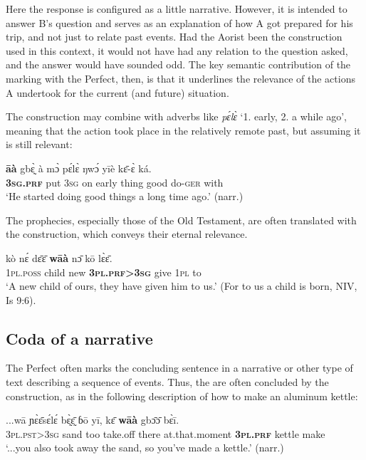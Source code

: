 \documentclass[output=paper]{LSP/langsci}
\begin{document}
Here the response is configured as a little narrative. However, it is intended to answer B's question and serves as an explanation of how A got prepared for his trip, and not just to relate past events. Had the Aorist been the construction used in this context, it would not have had any relation to the question asked, and the answer would have sounded odd. The key semantic contribution of the marking with the Perfect, then, is that it underlines the relevance of the actions A undertook for the current (and future) situation.


The  construction may combine with adverbs like \textit{pɛ́lɛ̀} ‘1. early, 2. a while ago’, meaning that the action took place in the relatively remote past, but assuming it is still relevant:

\begin{exe} \ex
\gll 	\textbf{āà}	gbɛ̰̀	à	mɔ̀	pɛ́lɛ̀	ŋwɔ́	yīè	kɛ̄-ɛ̀	ká.\\
	\textbf{3\textsc{sg}.\textsc{prf}}	put	3\textsc{sg}	on	early	thing	good	do-\textsc{ger}	with\\
\glt ‘He started doing good things a long time ago.’ (narr.)
\end{exe}


The prophecies, especially those of the Old Testament, are often translated with the  construction, which conveys their eternal relevance. 

\begin{exe} \ex
\gll 	kò	nɛ́	dɛ̄ɛ̄	\textbf{wāà}	nɔ̄	kō	lɛ̀ɛ̄.\\
	1\textsc{pl}.\textsc{poss}	child	new	\textbf{3\textsc{pl}.\textsc{prf}>3\textsc{sg}}	give	1\textsc{pl}	to	\\
\glt ‘A new child of ours, they have given him to us.’ (For to us a child is born, NIV, Is 9:6).
\end{exe}

\subsection{Coda of a narrative}
\label{khachcodanarr}
The Perfect often marks the concluding sentence in a narrative or other type of text describing a sequence of events. Thus, the  are often concluded by the  construction, as in the following description of how to make an aluminum kettle:

\begin{exe}\ex
\gll ...wā	ɲɛ̀ɛ̄sɛ́lɛ́	bɛ̰̀ɛ̰̄	ɓō	yī,	kɛ̄	\textbf{wāà}	gbɔ̄ɔ̄	bɛ̀ī.\\
3\textsc{pl}.\textsc{pst}>3\textsc{sg}	sand	too	take.off	there at.that.moment	\textbf{3\textsc{pl}.\textsc{prf}} kettle	make\\
\glt ‘...you also took away the sand, so you’ve made a kettle.’ (narr.)
\end{exe}
\end{document}
